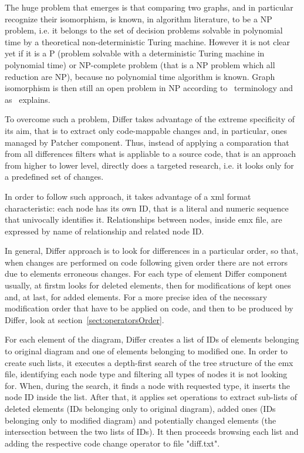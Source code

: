 The huge problem that emerges is that comparing two graphs, and in particular recognize their isomorphism,  is known, in algorithm literature, to be a NP problem, i.e. it belongs to the set of decision problems solvable in polynomial time by a theoretical non-deterministic Turing machine. However it is not clear yet if it is a P (problem solvable with a deterministic Turing machine in polynomial time) or NP-complete problem (that is a NP problem which all reduction are NP), because no polynomial time algorithm is known. Graph isomorphism is then still an open problem in NP according to~\cite{Garey} terminology and as~\cite{GraphsIso} explains. 

To overcome such a problem, Differ takes advantage of the extreme specificity of its aim, that is to extract only code-mappable changes and, in particular, ones managed by Patcher component.
Thus, instead of applying a comparation that from all differences filters what is appliable to a source code, that is an approach from higher to lower level, directly does a targeted research, i.e. it looks only for a predefined set of changes.

In order to follow such approach, it takes advantage of a xml format characteristic: each node has its own ID, that is a literal and numeric sequence that univocally identifies it. Relationships between nodes, inside emx file, are expressed by name of relationship and related node ID.

In general, Differ approach is to look for differences in a particular order, so that, when changes are performed on code following given order there are not errors due to elements erroneous changes. For each type of element Differ component usually, at firstm looks for deleted elements, then for modifications of kept ones and, at last, for added elements. For a more precise idea of the necessary modification order that have to be applied on code, and then to be produced by Differ, look at section~\ref{sect:operatorsOrder}.

For each element of the diagram, Differ creates a list of IDs of elements belonging to original diagram and one of elements belonging to modified one.
In order to create such lists, it executes a depth-first search of the tree structure of the emx file, identifying each node type and filtering all types of nodes it is not looking for. When, during the search, it finds a node with requested type, it inserts the node ID inside the list.
After that, it applies set operations to extract sub-lists of deleted elements (IDs belonging only to original diagram), added ones (IDs belonging only to modified diagram) and potentially changed elements (the intersection between the two lists of IDs). It then proceeds browsing each list and adding the respective code change operator to file "diff.txt".

